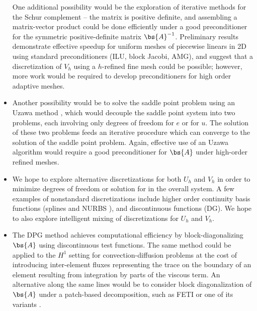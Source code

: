 \begin{itemize}
One additional possibility would be the exploration of iterative methods for the Schur complement -- the matrix is positive definite, and assembling a matrix-vector product could be done efficiently under a good preconditioner for the symmetric positive-definite matrix $\bs{A}^{-1}$.  Preliminary results demonstrate effective speedup for uniform meshes of piecewise linears in 2D using standard preconditioners (ILU, block Jacobi, AMG), and suggest that a discretization of $V_h$ using a $h$-refined fine mesh could be possible; however, more work would be required to develop preconditioners for high order adaptive meshes.  
\item Another possibility would be to solve the saddle point problem using an Uzawa method \cite{uzawa}, which would decouple the saddle point system into two problems, each involving only degrees of freedom for $e$ or for $u$.  The solution of these two problems feeds an iterative procedure which can converge to the solution of the saddle point problem.  Again, effective use of an Uzawa algorithm would require a good preconditioner for $\bs{A}$ under high-order refined meshes.
\item We hope to explore alternative discretizations for both $U_h$ and $V_h$ in order to minimize degrees of freedom or solution for in the overall system.  A few examples of nonstandard discretizations include higher order continuity basis functions (splines and NURBS \cite{NURBSorig}), and discontinuous functions (DG).  We hope to also explore intelligent mixing of discretizations for $U_h$ and $V_h$.  
\item The DPG method achieves computational efficiency by block-diagonalizing $\bs{A}$ using discontinuous test functions.  The same method could be applied to the $H^1$ setting for convection-diffusion problems at the cost of introducing inter-element fluxes representing the trace on the boundary of an element resulting from integration by parts of the viscous term.  An alternative along the same lines would be to consider block diagonalization of $\bs{A}$ under a patch-based decomposition, such as FETI or one of its variants \cite{FETI1,FETI2}.  
\end{itemize}

%
%
%
